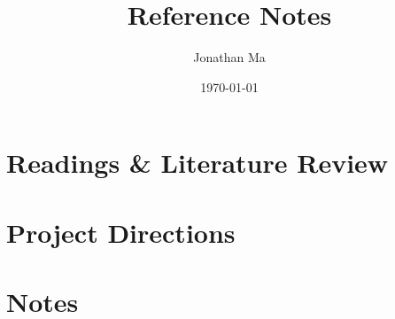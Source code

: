 \documentclass[11pt]{article}
\title{\textbf{Reference Notes}}
\author{Jonathan Ma}
\date{\today}
\begin{document}
\maketitle
\tableofcontents
\newpage

\part{Readings \& Literature Review}


\part{Project Directions}


\part{Notes}
\end{document}
